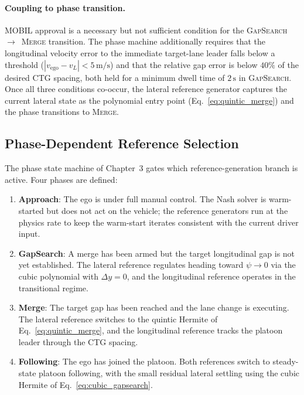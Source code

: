 \documentclass[12pt,a4paper,oneside]{report}
\begin{document}
\paragraph{Coupling to phase transition.} MOBIL approval is a necessary but not sufficient condition for the \textsc{GapSearch}~$\to$~\textsc{Merge} transition. The phase machine additionally requires that the longitudinal velocity error to the immediate target-lane leader falls below a threshold ($|v_{\text{ego}} - v_L| < 5\,\mathrm{m/s}$) and that the relative gap error is below $40\%$ of the desired CTG spacing, both held for a minimum dwell time of $2\,\mathrm{s}$ in \textsc{GapSearch}. Once all three conditions co-occur, the lateral reference generator captures the current lateral state as the polynomial entry point (Eq.~\eqref{eq:quintic_merge}) and the phase transitions to \textsc{Merge}.

\subsection{Phase-Dependent Reference Selection}
\label{sec:phase_reference}

The phase state machine of Chapter~3 gates which reference-generation branch is active. Four phases are defined:
\begin{enumerate}
\item \textbf{Approach}: The ego is under full manual control. The Nash solver is warm-started but does not act on the vehicle; the reference generators run at the physics rate to keep the warm-start iterates consistent with the current driver input.
\item \textbf{GapSearch}: A merge has been armed but the target longitudinal gap is not yet established. The lateral reference regulates heading toward $\psi \to 0$ via the cubic polynomial with $\Delta y = 0$, and the longitudinal reference operates in the transitional regime.
\item \textbf{Merge}: The target gap has been reached and the lane change is executing. The lateral reference switches to the quintic Hermite of Eq.~\eqref{eq:quintic_merge}, and the longitudinal reference tracks the platoon leader through the CTG spacing.
\item \textbf{Following}: The ego has joined the platoon. Both references switch to steady-state platoon following, with the small residual lateral settling using the cubic Hermite of Eq.~\eqref{eq:cubic_gapsearch}.
\end{enumerate}
\end{document}
